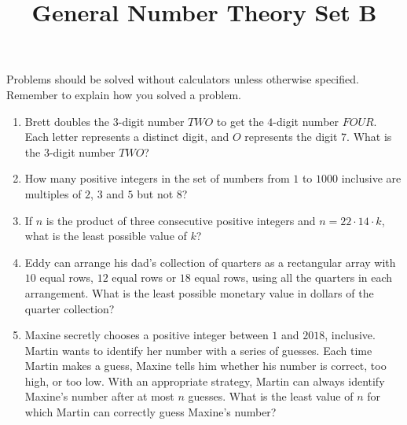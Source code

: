 \documentclass{article}
\title{General Number Theory Set B}
\date{}
\author{}
\begin{document}
\maketitle
\noindent Problems should be solved without calculators unless otherwise specified.
Remember to explain how you solved a problem.
\begin{multicols}{2}
    \begin{enumerate}
        \item Brett doubles the $3$-digit number $TWO$ to get the $4$-digit number $FOUR$.
            Each letter represents a distinct digit, and $O$ represents the digit $7$.
            What is the $3$-digit number $TWO$?
            \vspace{3cm}
        \item How many positive integers in the set of numbers from $1$ to $1000$ inclusive are multiples of $2$, $3$ and $5$ but not $8$?
            \vspace{3cm}
        \item If $n$ is the product of three consecutive positive integers and $n = 22 \cdot 14 \cdot k$, what is the least possible value of $k$?
            \vspace{3cm}
        \item Eddy can arrange his dad's collection of quarters as a rectangular array with $10$ equal rows, $12$ equal rows or $18$ equal rows, using all the quarters in each arrangement.
            What is the least possible monetary value in dollars of the quarter collection?
            \vspace{3cm}
        \item Maxine secretly chooses a positive integer between $1$ and $2018$, inclusive.
            Martin wants to identify her number with a series of guesses.
            Each time Martin makes a guess, Maxine tells him whether his number is correct, too high, or too low.
            With an appropriate strategy, Martin can always identify Maxine's number after at most $n$ guesses.
            What is the least value of $n$ for which Martin can correctly guess Maxine's number?
            \vspace{3cm}
    \end{enumerate}
\end{multicols}
\end{document}
